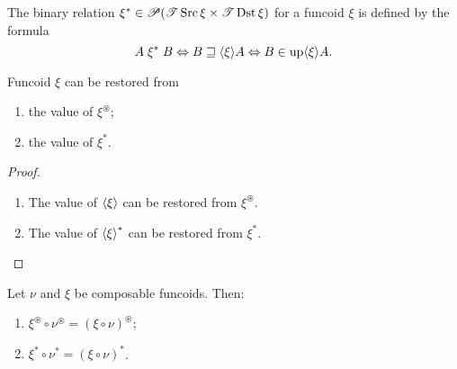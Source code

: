 \begin{defn}
The binary relation
$\xi^{\ast}\in\mathscr{P}(\mathscr{T}\operatorname{Src}\xi\times\mathscr{T}\operatorname{Dst}\xi)$
for a funcoid $\xi$ is defined by the formula
\[
A\mathrel{\xi^{\ast}}B\Leftrightarrow B\sqsupseteq\langle\xi\rangle
A\Leftrightarrow B\in\operatorname{up}\langle\xi\rangle A.
\]
\end{defn}
\begin{prop}
Funcoid $\xi$ can be restored from
\begin{enumerate}
\item the value of $\xi^{\circledast}$;
\item the value of $\xi^{\ast}$.
\end{enumerate}
\end{prop}
\begin{proof}
~
\begin{enumerate}
\item The value of $\left\langle \xi\right\rangle$ can be restored from $\xi^{\circledast}$.
\item The value of $\left\langle \xi\right\rangle ^{\ast}$ can be restored from $\xi^{\ast}$.
\end{enumerate}
\end{proof}
\begin{thm}
Let $\nu$ and $\xi$ be composable funcoids. Then:
\begin{enumerate}
\item
\label{fcomp-1}$\xi^{\circledast}\circ\nu^{\circledast}=(\xi\circ\nu)^{
\circledast}$;
\item \label{fcomp-2}$\xi^{\ast}\circ\nu^{\ast}=(\xi\circ\nu)^{\ast}$.
\end{enumerate}
\end{thm}

